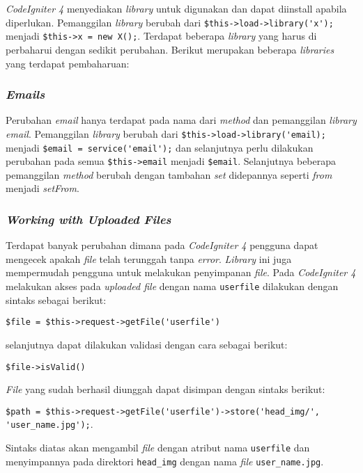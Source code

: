 \textit{CodeIgniter 4} menyediakan \textit{library} untuk digunakan dan dapat diinstall apabila diperlukan. Pemanggilan \textit{library} berubah dari \verb|$this->load->library('x');| menjadi \verb|$this->x = new X();|. Terdapat beberapa \textit{library} yang harus di perbaharui dengan sedikit perubahan. Berikut merupakan beberapa \textit{libraries} yang terdapat pembaharuan:

\subsubsection{\textit{Emails}}

Perubahan \textit{email} hanya terdapat pada nama dari \textit{method} dan pemanggilan \textit{library email}. Pemanggilan  \textit{library} berubah dari \verb|$this->load->library('email);| menjadi \verb|$email = service('email');| dan selanjutnya perlu dilakukan perubahan pada semua \verb|$this->email| menjadi \verb|$email|. Selanjutnya beberapa pemanggilan \textit{method} berubah dengan tambahan \textit{set} didepannya seperti \textit{from} menjadi \textit{setFrom}.

\subsubsection{\textit{Working with Uploaded Files}}

Terdapat banyak perubahan dimana pada \textit{CodeIgniter 4} pengguna dapat mengecek apakah \textit{file} telah terunggah tanpa \textit{error}. \textit{Library} ini juga mempermudah pengguna untuk melakukan penyimpanan \textit{file}. Pada \textit{CodeIgniter 4} melakukan akses pada \textit{uploaded file} dengan nama \texttt{userfile} dilakukan dengan sintaks sebagai berikut:
\begin{center}
\verb|$file = $this->request->getFile('userfile')|
\end{center} selanjutnya dapat dilakukan validasi dengan cara sebagai berikut:
\begin{center}
\verb|$file->isValid()|
\end{center} 
\textit{File} yang sudah berhasil diunggah dapat disimpan dengan sintaks berikut:
\begin{center}
\verb|$path = $this->request->getFile('userfile')->store('head_img/', 'user_name.jpg');|.
\end{center} 

Sintaks diatas akan mengambil \textit{file} dengan atribut nama \texttt{userfile} dan menyimpannya pada direktori \texttt{head\_img} dengan nama \textit{file} \texttt{user\_name.jpg}.

